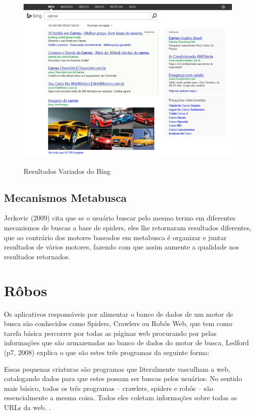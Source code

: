 \documentclass[
	12pt,				%
	openright,			%
	twoside,			%
	a4paper,			%
	english,			%
	french,				%
	spanish,			%
	brazil				%
	]{abntex2}
\begin{document}
\begin{figure}[hbtp]
\caption{Resultados Variados do Bing}
\centering
\includegraphics[totalheight=0.5\textheight]{img/resultados-bing.jpg}
\label{who}
\end{figure}

\subsection{Mecanismos Metabusca}

Jerkovic (2009) cita que se o usuário buscar pelo mesmo termo em diferentes mecanismos de buscas a base de spiders, eles lhe retornaram resultados diferentes, que ao contrário dos motores baseados em metabusca é organizar e juntar resultados de vários motores, fazendo com que assim aumente a qualidade nos resultados retornados.

\section{Rôbos}

Os aplicativos responsáveis por alimentar o banco de dados de um motor de busca são conhecidos como Spiders, Crawlers ou Robôs Web, que tem como tarefa básica percorrer por todas as páginas web procurando por pelas informações que são armazenadas no banco de dados do motor de busca, Ledford (p7, 2008) explica o que são estes três programas da seguinte forma:

\begin{citacao}
Essas pequenas criaturas são programas que literalmente vasculham a web, catalogando dados para que estes possam ser buscas pelos usuários. No sentido mais básico, todos os três programas – crawlers, spiders e robôs – são essencialmente a mesma coisa. Todos eles coletam informações sobre todas as URLs da web.
\cite[p7]{NBR10520:2002}.
\end{citacao}
\end{document}
